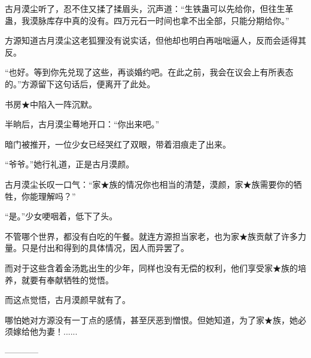 \begin{this_body}
古月漠尘听了，忍不住又揉了揉眉头，沉声道：“生铁蛊可以先给你，但往生革蛊，我漠脉库存中真的没有。四万元石一时间也拿不出全部，只能分期给你。”

方源知道古月漠尘这老狐狸没有说实话，但他却也明白再咄咄逼人，反而会适得其反。

“也好。等到你先兑现了这些，再谈婚约吧。在此之前，我会在议会上有所表态的。”方源留下这句话后，便离开了此处。

书房★中陷入一阵沉默。

半晌后，古月漠尘蓦地开口：“你出来吧。”

暗门被推开，一位少女已经哭红了双眼，带着泪痕走了出来。

“爷爷。”她行礼道，正是古月漠颜。

古月漠尘长叹一口气：“家★族的情况你也相当的清楚，漠颜，家★族需要你的牺牲，你能理解吗？”

“是。”少女哽咽着，低下了头。

不管哪个世界，都没有白吃的午餐。就连方源担当家老，也为家★族贡献了许多力量。只是付出和得到的具体情况，因人而异罢了。

而对于这些含着金汤匙出生的少年，同样也没有无偿的权利，他们享受家★族的培养，就要有奉献牺牲的觉悟。

而这点觉悟，古月漠颜早就有了。

哪怕她对方源没有一丁点的感情，甚至厌恶到憎恨。但她知道，为了家★族，她必须嫁给他为妻！......

------------

\end{this_body}

